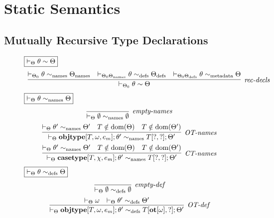 \section{Static Semantics}
\subsection{Mutually Recursive Type Declarations}
\begin{figure}[h]
$\fbox{$\vdash_\Theta \theta \sim \Theta$}$
\[
\begin{array}{c}
\infer[\textit{rec-decls}]
  {\vdash_{\Theta_0} \theta \sim \Theta}
  { \vdash_{\Theta_0} \theta \sim_{\text{names}} \Theta_{\text{names}}
  & \vdash_{\Theta_0 \Theta_{\text{names}}} \theta \sim_{\text{defs}} \Theta_{\text{defs}}
  & \vdash_{\Theta_0 \Theta_{\text{defs}}} \theta \sim_{\text{metadata}} \Theta
  } 
\end{array}
\]
$\fbox{$\vdash_\Theta \theta \sim_{\text{names}} \Theta$}$
\[
\begin{array}{c}
\infer[\textit{empty-names}]
  {\vdash_{\Theta} \emptyset \sim_{\text{names}} \emptyset}
  { }\\[1ex] 
  
\infer[\textit{OT-names}]
  {\vdash_{\Theta} \keyw{objtype}[T,\omega,e_m];\theta' \sim_{\text{names}} T[?,?];\Theta'}
  {\vdash_{\Theta} \theta' \sim_{\text{names}} \Theta'
  & T \notin \text{dom}(\Theta) & T \notin \text{dom}(\Theta')}\\[1ex]

\infer[\textit{CT-names}]
  {\vdash_{\Theta} \keyw{casetype}[T,\chi,e_m];\theta' \sim_{\text{names}} T[?,?];\Theta'}
  {\vdash_{\Theta} \theta' \sim_{\text{names}} \Theta'
  & T \notin \text{dom}(\Theta) & T \notin \text{dom}(\Theta')}
\end{array}
\]
$\fbox{$\vdash_\Theta \theta \sim_{\text{defs}} \Theta$}$
\[
\begin{array}{c}
\infer[\textit{empty-def}]
  {\vdash_{\Theta} \emptyset \sim_{\text{defs}} \emptyset}
  { }\\[1ex] 
  
\infer[\textit{OT-def}]
  {\vdash_{\Theta} \keyw{objtype}[T,\omega,e_m];\theta' \sim_{\text{defs}} T[\keyw{ot}[\omega], ?]; \Theta'}
  { \vdash_\Theta \omega
  & \vdash _\Theta \theta' \sim_{\text{defs}} \Theta'}\\[1ex]


\end{array}\]
\end{figure}
